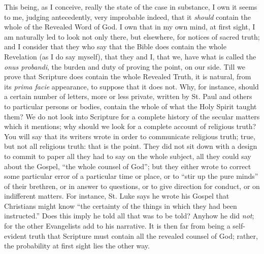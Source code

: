 This being, as I conceive, really the state of the case in
substance, I own it seems to me, judging antecedently, very improbable
indeed, that it \emph{should} contain the whole of the Revealed Word
of God. I own that in my own mind, at first sight, I am naturally led
to look not only there, but elsewhere, for notices of sacred truth;
and I consider that they who say that the Bible does contain the whole
Revelation (as I do say myself), that they and I, that we, have what
is called the \emph{onus probandi}, the burden and duty of proving the
point, on our side. Till we prove that Scripture does contain the
whole Revealed Truth, it is natural, from its \emph{prima facie}
appearance, to suppose that it does not. Why, for instance, should a
certain number of letters, more or less private, written by St. Paul
and others to particular persons or bodies, contain the whole of what
the Holy Spirit taught them? We do not look into Scripture for a
complete history of the secular matters which it mentions; why should
we look for a complete account of religious truth? You will say that
its writers wrote in order to communicate religious truth; true, but
not all religious truth: that is the point. They did not sit down with
a design to commit to paper all they had to say on the whole subject,
all they could say about the Gospel, ``the whole counsel of
God''; but they either wrote to correct some particular error of a
particular time or place, or to ``stir up the pure minds'' of
their brethren, or in answer to questions, or to give direction
for conduct, or on indifferent matters. For instance, St. Luke says he
wrote his Gospel that Christians might know ``the certainty of the
things in which they had been instructed.'' Does this imply he
told all that was to be told? Anyhow he did \emph{not}; for the other
Evangelists add to his narrative. It is then far from being a
self-evident truth that Scripture must contain all the revealed
counsel of God; rather, the probability at first sight lies the other
way.

